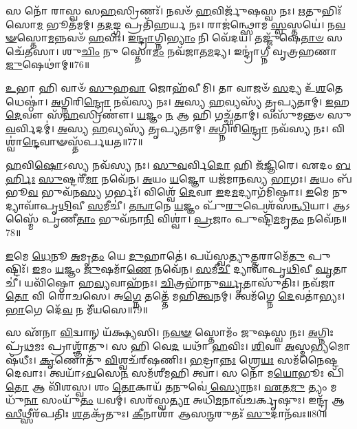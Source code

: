 𑌸 𑌨𑍋᳴ 𑌰𑌾𑌸𑍍𑌵 𑌸\-\ul{𑌹}\-𑌸𑍍𑌰𑌿𑌣𑌃᳴।
𑌨𑌵𑍞᳴ \ul{𑌹}\-𑌵𑌿𑌰𑍍𑌜𑍁᳴𑌷𑌸𑍍𑌵 𑌨𑌃।
\-\ul{𑌋}\-𑌤𑍁𑌭𑌿𑌃᳴ 𑌸𑍋\-\ul{𑌮} 𑌭𑍂𑌤᳴𑌮𑌮𑍍।
𑌤\-\ul{𑌦}\-𑌙𑍍𑌗 𑌪𑍍𑌰𑌤𑌿᳴\-𑌹𑌰𑍍𑌯 𑌨𑌃।
𑌰𑌾𑌜॑𑌨𑍍𑌥𑍍𑌸𑍋𑌮 \ul{𑌸𑍍𑌵}\-𑌸𑍍𑌤𑌯𑍇॑।
𑌨\-\ul{𑌵}\-\-\ul{𑍟}\-𑌸𑍍𑌤𑍋\-\ul{𑌮}\-𑌨𑍍𑌨𑌵𑍞᳴ \ul{𑌹}\-𑌵𑌿𑌃।
\-\ul{𑌇}\-\-\ul{𑌨𑍍𑌦𑍍𑌰𑌾}\-𑌗𑍍𑌨𑌿\-\ul{𑌭𑍍𑌯𑌾𑌂} 𑌨𑌿 𑌵𑍇᳴𑌦𑌯।
𑌤𑌜𑍍𑌜𑍁᳴𑌷𑍇\-\ul{𑌤𑌾}\-\-\ul{𑍞} 𑌸𑌚𑍇᳴𑌤𑌸𑌾।
𑌶𑍁\-\ul{𑌚𑌿𑌂} 𑌨𑍁 𑌸𑍍𑌤𑍋\-\ul{𑌮𑌂} 𑌨𑌵᳴𑌜𑌾𑌤\-\ul{𑌮}\-𑌦𑍍𑌯।
𑌇𑌨𑍍𑌦𑍍𑌰𑌾॑𑌗𑍍𑌨𑍀 𑌵𑍃𑌤𑍍𑌰𑌹𑌣𑌾 \ul{𑌜𑍁}\-𑌷𑍇𑌥𑌾॑𑌮𑍍॥76॥

\-\ul{𑌉}\-𑌭𑌾 𑌹𑌿 𑌵𑌾𑍞᳴ \ul{𑌸𑍁}\-𑌹\-\ul{𑌵𑌾} 𑌜𑍋𑌹᳴𑌵𑍀𑌮𑌿।
𑌤𑌾 𑌵𑌾𑌜𑍞᳴ \ul{𑌸}\-𑌦𑍍𑌯 𑌉᳴\-\ul{𑌶}\-𑌤𑍇 𑌧𑍇𑌷𑍍𑌠𑌾॑।
\-\ul{𑌅}\-𑌗𑍍𑌨𑌿𑌰𑌿\-\ul{𑌨𑍍𑌦𑍍𑌰𑍋} 𑌨𑌵᳴𑌸𑍍𑌯 𑌨𑌃।
\-\ul{𑌅}\-𑌸𑍍𑌯 \ul{𑌹}\-𑌵𑍍𑌯𑌸𑍍𑌯᳴ 𑌤𑍃𑌪𑍍𑌯𑌤𑌾𑌮𑍍।
\-\ul{𑌇}\-𑌹 \ul{𑌦𑍇}\-𑌵𑍗 𑌸᳴\-\ul{𑌹}\-𑌸𑍍𑌰𑌿𑌣𑍗॑।
\-\ul{𑌯}\-𑌜𑍍𑌞𑌂 \ul{𑌨} 𑌆 𑌹𑌿 𑌗𑌚𑍍𑌛᳴𑌤𑌾𑌮𑍍।
𑌵𑌸𑍁᳴𑌮𑌨𑍍𑌤𑍞 𑌸𑍁\-\ul{𑌵}\-𑌰𑍍𑌵𑌿𑌦𑌮𑍍॑।
\-\ul{𑌅}\-𑌸𑍍𑌯 \ul{𑌹}\-𑌵𑍍𑌯𑌸𑍍𑌯᳴ 𑌤𑍃𑌪𑍍𑌯𑌤𑌾𑌮𑍍।
\-\ul{𑌅}\-𑌗𑍍𑌨𑌿𑌰𑌿\-\ul{𑌨𑍍𑌦𑍍𑌰𑍋} 𑌨𑌵᳴𑌸𑍍𑌯 𑌨𑌃।
𑌵𑌿𑌶𑍍𑌵𑌾॑\-\ul{𑌨𑍍𑌦𑍇}\-𑌵𑌾𑍟𑌸𑍍𑌤᳴𑌰𑍍𑌪𑌯𑌤॥77॥

\-\ul{𑌹}\-𑌵𑌿\-\ul{𑌷𑍋}\-𑌽𑌸𑍍𑌯 𑌨𑌵᳴𑌸𑍍𑌯 𑌨𑌃।
\-\ul{𑌸𑍁}\-\-\ul{𑌵}\-𑌰𑍍𑌵𑌿\-\ul{𑌦𑍋} 𑌹𑌿 𑌜᳴\-\ul{𑌜𑍍𑌞𑌿}\-𑌰𑍇।
𑌏𑌦𑌂 \ul{𑌬}\-\-\ul{𑌰𑍍}\-𑌹𑌿𑌃 \ul{𑌸𑍁}\-𑌷𑍍𑌟𑌰𑍀᳴\-\ul{𑌮𑌾} 𑌨𑌵𑍇᳴𑌨।
\-\ul{𑌅}\-𑌯𑌂 \ul{𑌯}\-𑌜𑍍𑌞𑍋 𑌯𑌜᳴𑌮𑌾𑌨𑌸𑍍𑌯 \ul{𑌭𑌾}\-𑌗𑌃।
\-\ul{𑌅}\-𑌯𑌂 𑌬᳴𑌭𑍂\-\ul{𑌵} 𑌭𑍁𑌵᳴𑌨\-\ul{𑌸𑍍𑌯} 𑌗𑌰𑍍𑌭𑌃᳴।
𑌵𑌿𑌶𑍍𑌵𑍇᳴ \ul{𑌦𑍇}\-𑌵𑌾 \ul{𑌇}\-𑌦\-\ul{𑌮}\-𑌦𑍍𑌯𑌾𑌗᳴𑌮𑌿𑌷𑍍𑌠𑌾𑌃।
\-\ul{𑌇}\-𑌮𑍇 𑌨𑍁 𑌦𑍍𑌯𑌾𑌵𑌾᳴𑌪𑍃\-\ul{𑌥𑌿}\-𑌵𑍀 \ul{𑌸}\-𑌮𑍀𑌚𑍀॑।
\-\ul{𑌤}\-\-\ul{𑌨𑍍𑌵𑌾}\-𑌨𑍇 \ul{𑌯}\-𑌜𑍍𑌞𑌂 𑌪𑍁᳴\-\ul{𑌰𑍁}\-𑌪𑍇𑌶᳴𑌸\-\ul{𑌨𑍍𑌧𑌿}\-𑌯𑌾।
𑌆𑌽𑌸𑍍𑌮𑍈᳴ 𑌪𑍃𑌣𑍀\-\ul{𑌤𑌾𑌂} 𑌭𑍁𑌵᳴𑌨𑌾\-\ul{𑌨𑌿} 𑌵𑌿𑌶𑍍𑌵𑌾॑।
\-\ul{𑌪𑍍𑌰}\-𑌜𑌾𑌂 𑌪𑍁𑌷𑍍𑌟𑌿᳴\-\ul{𑌮}\-𑌮𑍃\-\ul{𑌤𑌂} 𑌨𑌵𑍇᳴𑌨॥78॥

\-\ul{𑌇}\-𑌮𑍇 \ul{𑌧𑍇}\-𑌨𑍂 \ul{𑌅}\-𑌮𑍃\-\ul{𑌤𑌂} 𑌯𑍇 \ul{𑌦𑍁}\-𑌹𑌾𑌤𑍇॑।
𑌪𑌯᳴𑌸𑍍𑌵𑌤𑍍𑌯𑍁\-\ul{𑌤𑍍𑌤}\-𑌰𑌾𑌮𑍇᳴\-\ul{𑌤𑍁} 𑌪𑍁𑌷𑍍𑌟𑌿𑌃᳴।
\-\ul{𑌇}\-𑌮𑌂 \ul{𑌯}\-𑌜𑍍𑌞𑌂 \ul{𑌜𑍁}\-𑌷𑌮𑌾᳴\-\ul{𑌣𑍇} 𑌨𑌵𑍇᳴𑌨।
\-\ul{𑌸}\-𑌮𑍀\-\ul{𑌚𑍀} 𑌦𑍍𑌯𑌾𑌵𑌾᳴𑌪𑍃\-\ul{𑌥𑌿}\-𑌵𑍀 \ul{𑌘𑍃}\-𑌤𑌾𑌚𑍀॑।
𑌯𑌵𑌿᳴𑌷𑍍𑌠𑍋 𑌹\-\ul{𑌵𑍍𑌯}\-𑌵𑌾𑌹᳴𑌨𑌃।
\-\ul{𑌚𑌿}\-𑌤𑍍𑌰𑌭𑌾᳴𑌨𑍁\-\ul{𑌰𑍍𑌘𑍃}\-𑌤𑌾𑌸𑍁᳴𑌤𑌿𑌃।
𑌨𑌵᳴𑌜𑌾\-\ul{𑌤𑍋} 𑌵𑌿 𑌰𑍋᳴𑌚𑌸𑍇।
𑌅\-\ul{𑌗𑍍𑌨𑍇} 𑌤𑌤𑍍𑌤𑍇᳴ 𑌮𑌹𑌿\-\ul{𑌤𑍍𑌵}\-𑌨𑌮𑍍।
𑌤𑍍𑌵𑌮᳴𑌗𑍍𑌨𑍇 \ul{𑌦𑍇}\-𑌵𑌤𑌾॑𑌭𑍍𑌯𑌃।
\-\ul{𑌭𑌾}\-𑌗𑍇 𑌦𑍇᳴\-\ul{𑌵} 𑌨 𑌮𑍀᳴𑌯𑌸𑍇॥79॥

𑌸 𑌏᳴𑌨𑌾 \ul{𑌵𑌿}\-𑌦𑍍𑌵𑌾𑌨𑍍 𑌯᳴𑌕𑍍𑌷𑍍𑌯𑌸𑌿।
𑌨\-\ul{𑌵}\-\-\ul{𑍟} 𑌸𑍍𑌤𑍋𑌮𑌂᳴ 𑌜𑍁𑌷𑌸𑍍𑌵 𑌨𑌃।
\-\ul{𑌅}\-𑌗𑍍𑌨𑌿𑌃 𑌪𑍍𑌰᳴\-\ul{𑌥}\-𑌮𑌃 𑌪𑍍𑌰𑌾𑌶𑍍𑌞𑌾᳴𑌤𑍁।
𑌸 𑌹𑌿 𑌵𑍇\-\ul{𑌦} 𑌯𑌥𑌾᳴ \ul{𑌹}\-𑌵𑌿𑌃।
\-\ul{𑌶𑌿}\-𑌵𑌾 \ul{𑌅}\-𑌸𑍍𑌮\-\ul{𑌭𑍍𑌯}\-𑌮𑍋𑌷᳴𑌧𑍀𑌃।
\-\ul{𑌕𑍃}\-𑌣𑍋𑌤𑍁᳴ \ul{𑌵𑌿}\-𑌶𑍍𑌵𑌚᳴𑌰𑍍‌\mbox{}𑌷𑌣𑌿𑌃।
\-\ul{𑌭}\-𑌦𑍍𑌰𑌾\-\ul{𑌨𑍍𑌨𑌃} 𑌶𑍍𑌰𑍇\-\ul{𑌯𑌃} 𑌸𑌮᳴𑌨𑍈𑌷𑍍𑌟 𑌦𑍇𑌵𑌾𑌃।
𑌤𑍍𑌵𑌯𑌾᳴\-𑌽\-\ul{𑌵}\-𑌸𑍇\-\ul{𑌨} 𑌸𑌮᳴𑌶𑍀𑌮𑌹𑌿 𑌤𑍍𑌵𑌾।
𑌸 𑌨𑍋᳴ 𑌮\-\ul{𑌯𑍋}\-𑌭𑍂𑌃 𑌪𑌿᳴\-\ul{𑌤𑍋} 𑌆 𑌵𑌿᳴𑌶𑌸𑍍𑌵।
𑌶𑌂 \ul{𑌤𑍋}\-𑌕𑌾𑌯᳴ \ul{𑌤}\-𑌨𑍁𑌵𑍇॑ \ul{𑌸𑍍𑌯𑍋}\-𑌨𑌃।
\-\ul{𑌏}\-𑌤\-\ul{𑌮𑍁} 𑌤𑍍𑌯𑌂 𑌮𑌧𑍁᳴\-\ul{𑌨𑌾} 𑌸𑌂𑌯𑍁᳴\-\ul{𑌤𑌂} 𑌯𑌵𑌮𑍍॑।
𑌸𑌰᳴𑌸𑍍𑌵\-\ul{𑌤𑍍𑌯𑌾} 𑌅𑌧𑌿᳴\-\ul{𑌮}\-𑌨𑌾𑌵᳴𑌚𑌰𑍍𑌕𑍃𑌷𑍁𑌃।
𑌇𑌨𑍍𑌦𑍍𑌰᳴ 𑌆\-\ul{𑌸𑍀}\-𑌥𑍍𑌸𑍀𑌰᳴𑌪𑌤𑌿𑌃 \ul{𑌶}\-𑌤𑌕𑍍𑌰᳴𑌤𑍁𑌃।
\-\ul{𑌕𑍀}\-𑌨𑌾𑌶𑌾᳴ 𑌆𑌸\-\ul{𑌨𑍍𑌮}\-𑌰𑍁𑌤𑌃᳴ \ul{𑌸𑍁}\-𑌦𑌾𑌨᳴𑌵𑌃॥80॥\anuvakamend[\-\ul{𑌪𑍁}\-\-\ul{𑌰}\-\-\ul{𑌏}\-𑌤𑌾 𑌵𑍃᳴𑌣𑍀𑌮𑌹𑍇 \ul{𑌜𑍁}\-𑌷𑍇𑌥𑌾॑𑌨𑍍𑌤𑌰𑍍𑌪𑌯\-\ul{𑌤𑌾}\-𑌮𑍃\-\ul{𑌤}\-𑌨𑍍𑌨𑌵𑍇᳴𑌨 𑌮𑍀𑌯𑌸𑍇 \ul{𑌸𑍍𑌯𑍋}\-𑌨\-\ul{𑌶𑍍𑌚}\-𑌤𑍍𑌵𑌾𑌰𑌿᳴ 𑌚]




